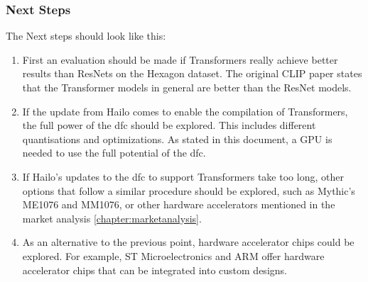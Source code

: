 \subsubsection*{Next Steps}
The Next steps should look like this:
\begin{enumerate}
    \item First an evaluation should be made if Transformers really achieve better results than ResNets on the Hexagon dataset.
    The original CLIP paper \cite{clip} states that the Transformer models in general are better than the ResNet models.
    \item If the update from Hailo comes to enable the compilation of Transformers, the full power of the \acrshort{dfc} should be explored.
    This includes different quantisations and optimizations.
    As stated in this document, a GPU is needed to use the full potential of the \acrshort{dfc}.
    \item If Hailo's updates to the \acrshort{dfc} to support Transformers take too long, other options that follow a similar procedure should be explored, such as Mythic's ME1076 and MM1076, or other hardware accelerators mentioned in the market analysis \cref{chapter:marketanalysis}.
    \item As an alternative to the previous point, hardware accelerator chips could be explored.
    For example, ST Microelectronics and ARM offer hardware accelerator chips that can be integrated into custom designs.
\end{enumerate}

